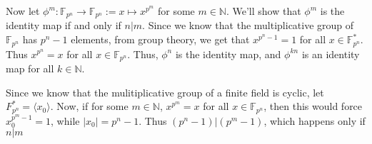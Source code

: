 \documentclass[12pt]{exam}
\theoremstyle{plain} %
\theoremstyle{definition} %
\theoremstyle{remark} %
\begin{document}
\begin{questions}
\begin{solution}
    Now let $\phi^m : \mathbb{F}_{p^n} \to \mathbb{F}_{p^n} := x
    \mapsto x^{p^m}$ for some $m \in \mathbb{N}$. We'll show that
    $\phi^m$ is the identity map if and only if $n|m$. Since we
    know that the multiplicative group of $\mathbb{F}_{p^n}$ has $p^n
    - 1$ elements, from group theory, we get that $x^{p^n - 1} = 1$
    for all $x \in \mathbb{F}_{p^n}^*$. Thus $x^{p^n} = x$ for all $ x
    \in \mathbb{F}_{p^n}$. Thus, $\phi^n$ is the identity map, and
    $\phi^{kn}$ is an identity map for all $k \in \mathbb{N}$.

    Since we know that the mulitiplicative group
    of a finite field is cyclic, let $F_{p^n}^* = \langle x_0
    \rangle$. Now, if for some $m \in \mathbb{N}$, $x^{p^m} = x$
    for all $x \in \mathbb{F}_{p^n}$, then this would force $x_0^{p^m
    - 1} = 1$, while $|x_0| = p^n - 1$. Thus $(p^n - 1)|(p^m - 1)$,
    which happens only if $n|m$
  \end{solution}

\end{questions}
\printbibliography[heading=bibintoc]
\end{document}
